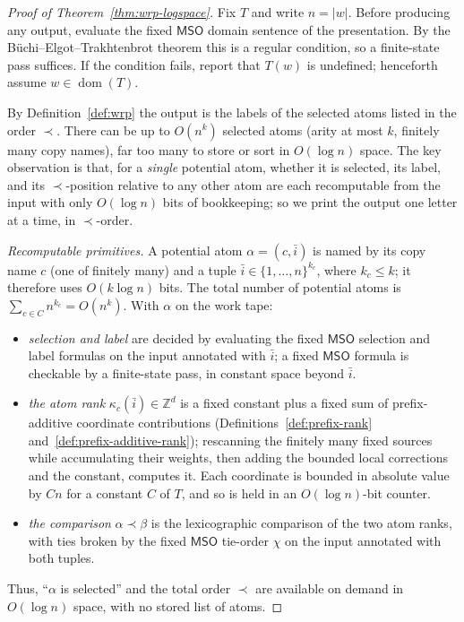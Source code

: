 \documentclass[11pt]{article}
\theoremstyle{definition}
\newcommand{\Z}{\mathbb Z}
\newcommand{\MSO}{\mathsf{MSO}}
\begin{document}
\begin{proof}[Proof of Theorem~\ref{thm:wrp-logspace}]
Fix $T$ and write $n=|w|$.  Before producing any output, evaluate the fixed
$\MSO$ domain sentence of the presentation.  By the
B\"uchi--Elgot--Trakhtenbrot theorem this is a regular condition, so a
finite-state pass suffices.  If the condition fails, report that $T(w)$ is
undefined; henceforth assume $w\in\operatorname{dom}(T)$.

By Definition~\ref{def:wrp} the output is the
labels of the selected atoms listed in the order $\prec$.  There can be up to
$O(n^k)$ selected atoms (arity at most $k$, finitely many copy names), far too many
to store or sort in $O(\log n)$ space.  The key observation is that, for a
\emph{single}
potential atom, whether it is selected, its label, and its $\prec$-position
relative to any other atom are each recomputable from the input with only
$O(\log n)$ bits of bookkeeping; so we print the output one letter at a time,
in $\prec$-order.

\vspace{0.5em}
\noindent\emph{Recomputable primitives.}
A potential atom $\alpha=(c,\bar i)$ is named by its copy name $c$ (one of
finitely many) and a tuple $\bar i\in\{1,\ldots,n\}^{k_c}$, where $k_c\le k$; it
therefore uses $O(k\log n)$ bits.  The total number of potential atoms is
$\sum_{c\in C}n^{k_c}=O(n^k)$.  With $\alpha$ on the work tape:
\begin{itemize}
\item \emph{selection and label} are decided by evaluating the fixed $\MSO$
selection and label formulas on the input annotated with $\bar i$; a fixed
$\MSO$ formula is checkable by a finite-state pass, in constant space beyond
$\bar i$.
\item \emph{the atom rank} $\kappa_c(\bar i)\in\Z^d$ is a fixed constant plus a
fixed sum of prefix-additive coordinate contributions
(Definitions~\ref{def:prefix-rank} and~\ref{def:prefix-additive-rank});
rescanning the finitely many fixed sources while accumulating their weights,
then adding the bounded local corrections and the constant, computes it.  Each
coordinate is bounded in absolute value by $Cn$ for a constant $C$ of $T$, and
so is held in an $O(\log n)$-bit counter.
\item \emph{the comparison} $\alpha\prec\beta$ is the lexicographic comparison
of the two atom ranks, with ties broken by the fixed $\MSO$ tie-order $\chi$ on the
input annotated with both tuples.
\end{itemize}
Thus, ``$\alpha$ is selected'' and the total order $\prec$ are available on
demand in $O(\log n)$ space, with no stored list of atoms.


\end{proof}
\end{document}
